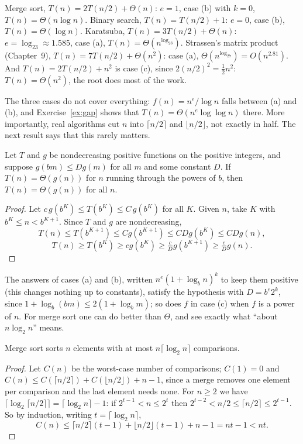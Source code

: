 \begin{example}\label{exa:master}
Merge sort, $T(n)=2T(n/2)+\Theta(n)$: $e=1$, case (b) with $k=0$, $T(n)=\Theta(n\log n)$. Binary search, $T(n)=T(n/2)+1$: $e=0$, case (b),
$T(n)=\Theta(\log n)$. Karatsuba, $T(n)=3T(n/2)+\Theta(n)$: $e=\log_23\approx1.585$, case (a), $T(n)=\Theta(n^{\log_23})$. Strassen's matrix
product (Chapter~9), $T(n)=7T(n/2)+\Theta(n^2)$: case (a), $\Theta(n^{\log_27})=O(n^{2.81})$. And $T(n)=2T(n/2)+n^2$ is case (c), since
$2(n/2)^2=\frac12n^2$: $T(n)=\Theta(n^2)$, the root does most of the work.
\end{example}

The three cases do not cover everything: $f(n)=n^e/\log n$ falls between (a) and (b), and Exercise~\ref{ex:gap} shows that
$T(n)=\Theta(n^e\log\log n)$ there. More importantly, real algorithms cut $n$ into $\lceil n/2\rceil$ and $\lfloor n/2\rfloor$, not exactly in half.
The next result says that this rarely matters.

\begin{proposition}\label{prop:alln}
Let $T$ and $g$ be nondecreasing positive functions on the positive integers, and suppose $g(bm)\le Dg(m)$ for all $m$ and some constant
$D$. If $T(n)=\Theta(g(n))$ for $n$ running through the powers of $b$, then $T(n)=\Theta(g(n))$ for all $n$.
\end{proposition}
\begin{proof}
Let $c\,g(b^K)\le T(b^K)\le C\,g(b^K)$ for all $K$. Given $n$, take $K$ with $b^K\le n<b^{K+1}$. Since $T$ and $g$ are nondecreasing,
\[
T(n)\le T(b^{K+1})\le Cg(b^{K+1})\le CDg(b^K)\le CDg(n),
\]
\[
T(n)\ge T(b^K)\ge cg(b^K)\ge\tfrac cDg(b^{K+1})\ge\tfrac cDg(n).
\]
\end{proof}

The answers of cases (a) and (b), written $n^e(1+\log_bn)^k$ to keep them positive (this changes nothing up to constants), satisfy the
hypothesis with $D=b^e2^k$, since $1+\log_b(bm)\le2(1+\log_bm)$; so does $f$ in case (c) when $f$ is a power of $n$. For merge sort one can do better than
$\Theta$, and see exactly what ``about $n\log_2n$'' means.

\begin{proposition}\label{prop:mergesort}
Merge sort sorts $n$ elements with at most $n\lceil\log_2n\rceil$ comparisons.
\end{proposition}
\begin{proof}
Let $C(n)$ be the worst-case number of comparisons; $C(1)=0$ and $C(n)\le C(\lceil n/2\rceil)+C(\lfloor n/2\rfloor)+n-1$, since a merge removes
one element per comparison and the last element needs none. For $n\ge2$ we have $\lceil\log_2\lceil n/2\rceil\rceil=\lceil\log_2n\rceil-1$: if $2^{t-1}<n\le2^t$ then
$2^{t-2}<n/2\le\lceil n/2\rceil\le2^{t-1}$. So by induction, writing $t=\lceil\log_2n\rceil$,
\[
C(n)\le\lceil n/2\rceil(t-1)+\lfloor n/2\rfloor(t-1)+n-1=nt-1<nt.
\]
\end{proof}

